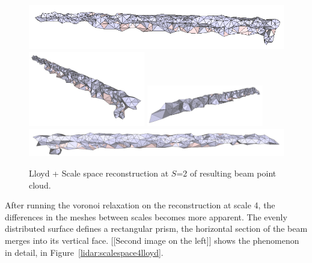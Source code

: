 \documentclass[12pt]{drexelthesis}
\begin{document}
\begin{figure}[!ht]
	\centering
		\includegraphics[width=5in]{real-lab-scans/optimizedNeat/scalespace2lloyd00.png}
		\includegraphics[width=2in]{real-lab-scans/optimizedNeat/scalespace2lloyd01.png}
		\includegraphics[width=2in]{real-lab-scans/optimizedNeat/scalespace2lloyd02.png}
		\includegraphics[width=5in]{real-lab-scans/optimizedNeat/scalespace2lloyd03.png}
		\caption[Lloyd + Scale space reconstruction at $S$=2 of segmented LiDAR data]{\centering Lloyd + Scale space reconstruction at $S$=2 of resulting beam point cloud.}
	\label{lidar:scalespace2lloyd}
\end{figure}

After running the voronoi relaxation on the reconstruction at scale 4, the differences in the meshes between scales becomes more apparent. The evenly distributed surface defines a rectangular prism, the horizontal section of the beam merges into its vertical face. [[Second image on the left]] shows the phenomenon in detail, in Figure~\ref{lidar:scalespace4lloyd}.
\end{document}
